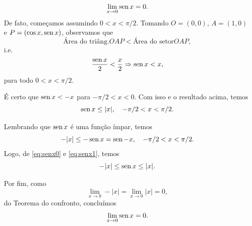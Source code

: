 \begin{ex}\label{ex:senx}
  \begin{equation}
    \lim_{x\to 0} \operatorname{sen} x = 0.
  \end{equation}
  De fato, começamos assumindo $0<x<\pi/2$. Tomando $O = (0,0)$, $A=(1,0)$ e $P = (\cos x, \operatorname{sen} x)$, observamos que
  \begin{equation}
    \text{Área do triâng.} OAP < \text{Área do setor} OAP,
  \end{equation}
  i.e.
  \begin{equation}
    \frac{\operatorname{sen} x}{2} < \frac{x}{2} \Rightarrow \operatorname{sen} x < x,
  \end{equation}
  para todo $0< x < \pi/2$. 

  É certo que $\operatorname{sen} x < -x$ para $-\pi/2 < x < 0$. Com isso e o resultado acima, temos
  \begin{equation}\label{eq:senx0}
    \operatorname{sen} x \leq |x|,\quad -\pi/2 < x < \pi/2.
  \end{equation}

  Lembrando que $\operatorname{sen} x$ é uma função ímpar, temos
  \begin{equation}\label{eq:senx1}
    -|x| \leq -\operatorname{sen} x = \operatorname{sen} -x,\quad -\pi/2 < x < \pi/2.
  \end{equation}
  Logo, de \eqref{eq:senx0} e \eqref{eq:senx1}, temos
  \begin{equation}
    -|x| \leq \operatorname{sen} x \leq |x|.
  \end{equation}

  Por fim, como
  \begin{equation}
    \lim_{x\to 0} -|x| = \lim_{x\to 0} |x| = 0,
  \end{equation}
  do Teorema do confronto, concluímos
  \begin{equation}
    \lim_{x\to 0} \operatorname{sen} x = 0.
  \end{equation}
\end{ex}

